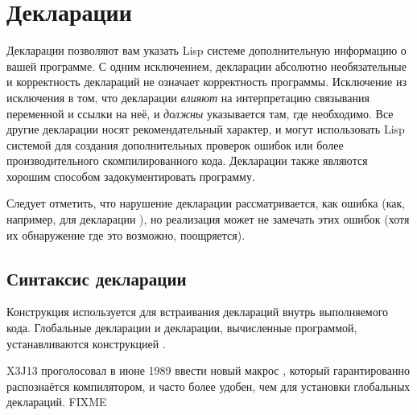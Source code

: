\else

\chapter{Декларации}
\label{DECLAR}

Декларации позволяют вам указать Lisp системе дополнительную информацию о вашей
программе. С одним исключением, декларации абсолютно необязательные и
корректность деклараций не означает корректность программы. Исключение из
исключения в том, что декларации  \emph{влияют} на интерпретацию
связывания переменной и ссылки на неё, и \emph{должны} указывается там, где
необходимо.
Все другие декларации носят рекомендательный характер, и могут использовать Lisp
системой для создания дополнительных проверок ошибок или более производительного
скомпилированного кода. Декларации также являются хорошим способом
задокументировать программу.

Следует отметить, что нарушение декларации рассматривается, как ошибка (как,
например, для декларации ), но реализация может не замечать этих
ошибок (хотя их обнаружение где это возможно, поощряется).

\section{Синтаксис декларации}
\label{DECLARE-SYNTAX-SECTION}

Конструкция  используется для встраивания деклараций внутрь
выполняемого кода. Глобальные декларации и декларации, вычисленные программой,
устанавливаются конструкцией .

\begin{newer}
X3J13 проголосовал в июне 1989
ввести новый макрос , который гарантированно 
распознаётся компилятором, и часто более удобен, чем  для
установки глобальных деклараций. FIXME
\end{newer}

